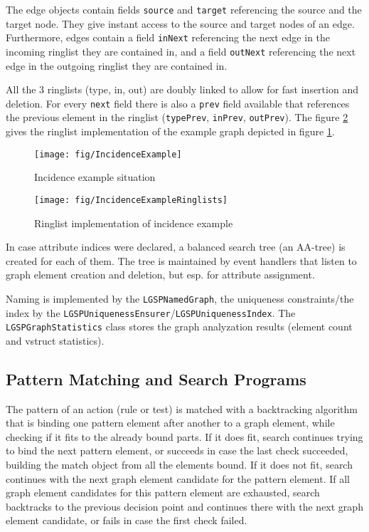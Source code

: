 The edge objects contain fields \texttt{source} and \texttt{target} referencing the source and the target node.
They give instant access to the source and target nodes of an edge.
Furthermore, edges contain a field \texttt{inNext} referencing the next edge in the incoming ringlist they are contained in, and a field \texttt{outNext} referencing the next edge in the outgoing ringlist they are contained in.

All the 3 ringlists (type, in, out) are doubly linked to allow for fast insertion and deletion.
For every \texttt{next} field there is also a \texttt{prev} field available that references the previous element in the ringlist (\texttt{typePrev}, \texttt{inPrev}, \texttt{outPrev}).
The figure \ref{figincidenceexampleringlists} gives the ringlist implementation of the example graph depicted in figure \ref{figincidenceexample}. 

\begin{figure}[phtb]
  \centering
  \texttt{[image: fig/IncidenceExample]}
  \caption{Incidence example situation}
  \label{figincidenceexample}
\end{figure}

\begin{figure}[phtb]
  \centering
  \texttt{[image: fig/IncidenceExampleRinglists]}
  \caption{Ringlist implementation of incidence example}
  \label{figincidenceexampleringlists}
\end{figure}

In case attribute indices were declared, a balanced search tree (an AA-tree) is created for each of them.
The tree is maintained by event handlers that listen to graph element creation and deletion, but esp. for attribute assignment.

Naming is implemented by the \texttt{LGSPNamedGraph}, the uniqueness constraints/the index by the \texttt{LGSPUniquenessEnsurer}/\texttt{LGSPUniquenessIndex}.
The \texttt{LGSPGraphStatistics} class stores the graph analyzation results (element count and vstruct statistics).

\pagebreak

\subsection*{Pattern Matching and Search Programs}

The pattern of an action (rule or test) is matched with a backtracking algorithm that is binding one pattern element after another to a graph element, while checking if it fits to the already bound parts. 
If it does fit, search continues trying to bind the next pattern element, 
or succeeds in case the last check succeeded, building the match object from all the elements bound.
If it does not fit, search continues with the next graph element candidate for the pattern element.
If all graph element candidates for this pattern element are exhausted, search backtracks to the previous decision point and continues there with the next graph element candidate, or fails in case the first check failed.

